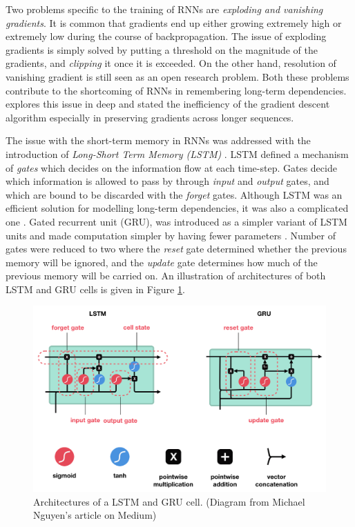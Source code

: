 Two problems specific to the training of RNNs are \textit{exploding and vanishing gradients}. It is common that gradients end up either growing extremely high or extremely low during the course of backpropagation. The issue of exploding gradients is simply solved by putting a threshold on the magnitude of the gradients, and \textit{clipping} it once it is exceeded. On the other hand, resolution of vanishing gradient is still seen as an open research problem. Both these problems contribute to the shortcoming of RNNs in remembering long-term dependencies. \cite{longterm_is_difficult:1994} explores this issue in deep and stated the inefficiency of the gradient descent algorithm especially in preserving gradients across longer sequences. 

The issue with the short-term memory in RNNs was addressed with the introduction of \textit{Long-Short Term Memory (LSTM)} \citep{lstms}. LSTM defined a mechanism of \textit{gates} which decides on the information flow at each time-step. Gates decide which information is allowed to pass by through \textit{input} and \textit{output} gates, and which are bound to be discarded with the \textit{forget} gates. Although LSTM was an efficient solution for modelling long-term dependencies, it was also a complicated one \citep{bengio_dl}. Gated recurrent unit (GRU), was introduced as a simpler variant of LSTM units and made computation simpler by having fewer parameters \cite{gru}. Number of gates were reduced to two where the \textit{reset} gate determined whether the previous memory will be ignored, and the \textit{update} gate determines how much of the previous memory will be carried on. An illustration of architectures of both LSTM and GRU cells is given in Figure \ref{sota:figure:lstm_gru}.

\begin{figure}[t]
  \centering
  \includegraphics[width=0.85\linewidth]{img/lstm_gru.png}
  \caption[Architectures of a LSTM and GRU cell.]{Architectures of a LSTM and GRU cell. (Diagram from Michael Nguyen's article on Medium\protect\footnotemark)}
  \label{sota:figure:lstm_gru}
\end{figure}

